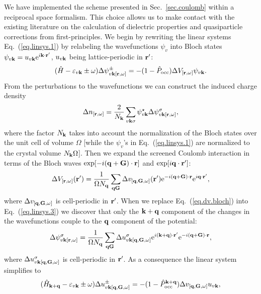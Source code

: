 \documentclass[twocolumn,prb,showpacs,superscriptaddress]{revtex4}
\def\w{\omega}
\def\H{\hat{H}}
\def\P{\hat{P}_{\rm occ}}
\def\E{\varepsilon}
\def\q{{\bf q}}
\def\s{\sigma}
\def\k{{\bf k}}
\def\G{{\bf G}}
\def\r{{\bf r}}
\def\rp{{\bf r^\prime}}
\begin{document}
We have implemented the scheme presented in Sec.\ \ref{sec.coulomb}
within a reciprocal space formalism. This choice allows us to make
contact with the existing literature on the 
calculation of dielectric properties and quasiparticle 
corrections from first-principles.\cite{hl86,balde_tosa,baroni-resta,hl86-prb,reining,cpm}
%
We begin by rewriting 
the linear systems Eq.\ (\ref{eq.linsys.1})
by relabeling the wavefunctions $\psi_v$ into Bloch states
$\psi_{v\k}=u_{v\k} {\rm e}^{i\k\cdot\rp}$, $u_{v\k}$ being
lattice-periodic in $\rp$:
  \begin{equation}\label{eq.linsys.3}
  (\H-\E_{v\k}\pm\w) \Delta \psi^\pm_{v\k[\r,\w]}  = -(1-\P)  \Delta V_{[\r,\w]} \psi_{v\k}.
  \end{equation}
From the perturbations to the wavefunctions we can construct the
induced charge density
  \begin{equation}\label{eq.ch}
  \Delta n_{[\r,\w]} = \frac{2}{N_\k}\sum_{v\k\s} \psi_{v\k}^\star  \Delta \psi^\s_{v\k[\r,\w]},
  \end{equation}
where the factor $N_\k$ takes into account the normalization of
the Bloch states over the unit cell of volume $\Omega$
[while the $\psi_v$'s in Eq.\ (\ref{eq.linsys.1}) are normalized to the crystal volume
$N_\k \Omega$].
Then we expand the screened Coulomb interaction in terms
of the Bloch waves ${\rm exp}[-i(\q+\G)\cdot\r]$ and ${\rm exp}[i\q\cdot\rp]$:
  \begin{equation}\label{eq.dv.bloch}
  \Delta V_{[\r,\w]} (\rp) = \frac{1}{\Omega N_\q}  \sum_{\q\G} \Delta v_{[\q,\G,\w]}(\rp) 
   {\rm e}^{-i(\q+\G)\cdot\r} {\rm e}^{i\q\cdot\rp}, 
  \end{equation}
where $\Delta v_{[\q,\G,\w]}$ is cell-periodic in $\rp$.
When we replace Eq.\ (\ref{eq.dv.bloch}) into Eq.\ (\ref{eq.linsys.3})
we discover that only the $\k+\q$ component of the changes in the wavefunctions
couple to the $\q$ component of the potential:
  \begin{equation}
  \Delta \psi^\sigma_{v\k[\r,\w]} = \frac{1}{\Omega N_\q} \sum_{\q\G} \Delta u^\sigma_{v\k[\q,\G,\w]} 
  {\rm e}^{i(\k+\q)\cdot\rp} {\rm e}^{-i(\q+\G)\cdot\r},
  \end{equation}
where $\Delta u^\sigma_{v\k[\q,\G,\w]}$ is cell-periodic in $\rp$.
As a consequence the linear system simplifies to
  \begin{equation}\label{eq.linsys.4}
  (\H_{\k+\q}-\E_{v\k}\pm\w) \Delta u^\pm_{v\k[\q,\G,\w]}  = -(1-\P^{\k+\q}) \Delta v_{[\q,\G,\w]} u_{v\k},
  \end{equation}
\end{document}

